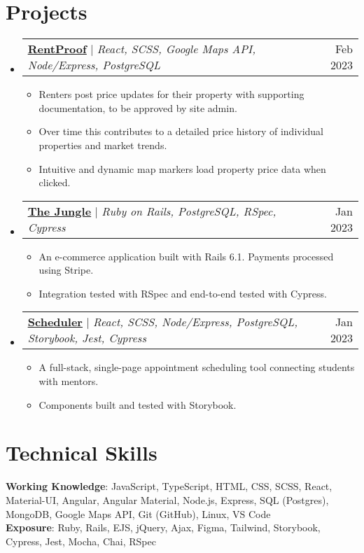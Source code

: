 \documentclass[letterpaper,11pt]{article}
\makeatletter
\newcommand{\resumeItem}[1]{
  \item\small{
    {#1 \vspace{-2pt}}
  }
}
\newcommand{\resumeProjectHeading}[2]{
    \item
    \begin{tabular*}{0.97\textwidth}{l@{\extracolsep{\fill}}r}
      \small#1 & #2 \\
    \end{tabular*}\vspace{-7pt}
}
\newcommand{\resumeSubHeadingListStart}{\begin{itemize}[leftmargin=0.15in, label={}]}
\newcommand{\resumeSubHeadingListEnd}{\end{itemize}}
\newcommand{\resumeItemListStart}{\begin{itemize}}
\newcommand{\resumeItemListEnd}{\end{itemize}\vspace{-5pt}}
\makeatother
\begin{document}
\section{Projects}
    \resumeSubHeadingListStart
      \resumeProjectHeading
          {\href{https://github.com/JackDuluoz/RentProof}{\textbf{\underline{RentProof}}} $|$ \emph{React, SCSS, Google Maps API, Node/Express, PostgreSQL}}{Feb 2023}
          \resumeItemListStart
            \resumeItem{Renters post price updates for their property with supporting documentation, to be approved by site admin.}
            \resumeItem{Over time this contributes to a detailed price history of individual properties and market trends.}
            \resumeItem{Intuitive and dynamic map markers load property price data when clicked.}
          \resumeItemListEnd
      \resumeProjectHeading
          {\href{https://github.com/JackDuluoz/jungle-rails}
          {\textbf{\underline{The Jungle}}} $|$ \emph{Ruby on Rails, PostgreSQL, RSpec, Cypress}}{Jan 2023}
          \resumeItemListStart
            \resumeItem{An e-commerce application built with Rails 6.1. Payments processed using Stripe.}
            \resumeItem{Integration tested with RSpec and end-to-end tested with Cypress.}
          \resumeItemListEnd
      \resumeProjectHeading
          {\href{https://github.com/JackDuluoz/scheduler}
          {\textbf{\underline{Scheduler}}} $|$ \emph{React, SCSS, Node/Express, PostgreSQL, Storybook, Jest, Cypress}}{Jan 2023}
          \resumeItemListStart
            \resumeItem{A full-stack, single-page appointment scheduling tool connecting students with mentors.}
            \resumeItem{Components built and tested with Storybook.}
          \resumeItemListEnd
    \resumeSubHeadingListEnd



%
\section{Technical Skills}
 \begin{itemize}[leftmargin=0.15in, label={}]
    \small{\item{
     \textbf{Working Knowledge}{: JavaScript, TypeScript, HTML, CSS, SCSS, React, Material-UI, Angular, Angular Material, Node.js, Express, SQL (Postgres), MongoDB, Google Maps API, Git (GitHub), Linux, VS Code} \\
     \textbf{Exposure}{: Ruby, Rails, EJS, jQuery, Ajax, Figma, Tailwind, Storybook, Cypress, Jest, Mocha, Chai, RSpec} \\
    }}
 \end{itemize}


\end{document}
